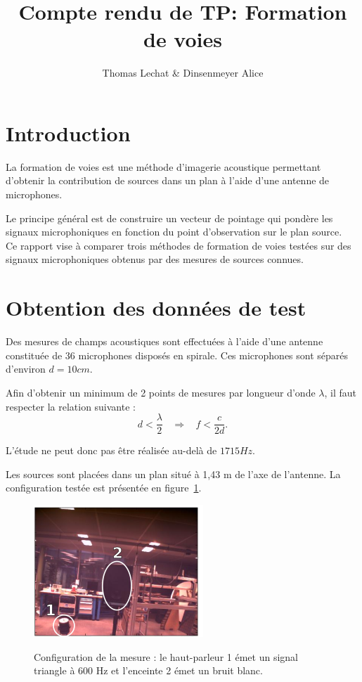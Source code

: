 \documentclass[a4paper]{article}
\title{Compte rendu de TP: Formation de voies }
\author{Thomas Lechat \& Dinsenmeyer Alice}
\begin{document}
\maketitle



\section{Introduction}

La formation de voies est une méthode d'imagerie acoustique permettant d'obtenir la contribution de sources dans un plan à l'aide d'une antenne de microphones. 

Le principe général est de construire un vecteur de pointage qui pondère les signaux microphoniques en fonction du point d'observation sur le plan source.\\

Ce rapport vise à comparer trois méthodes de formation de voies testées sur des signaux microphoniques obtenus par des mesures de sources connues. 

\section{Obtention des données de test}

Des mesures de champs acoustiques sont effectuées à l'aide d'une antenne constituée de 36 microphones disposés en spirale. Ces microphones sont séparés d'environ $d=10cm$.

Afin d'obtenir un minimum de 2 points de mesures par longueur d'onde $\lambda$, il faut respecter la relation suivante : $$d < \frac{\lambda}{2} ~~~~\Rightarrow~~~~ f < \frac{c}{2d}.$$

L'étude ne peut donc pas être réalisée au-delà de $1715 Hz$.

Les sources sont placées dans un plan situé à 1,43 m de l'axe de l'antenne. La configuration testée est présentée en figure~\ref{exp}.

\begin{figure}[!h]
	\centering
	\caption{Configuration de la mesure : le haut-parleur 1 émet un signal triangle à 600 Hz et l'enceinte 2 émet un bruit blanc.}
		\includegraphics[width=.5\textwidth]{exp.png} 
	\label{exp}
\end{figure}
\end{document}
